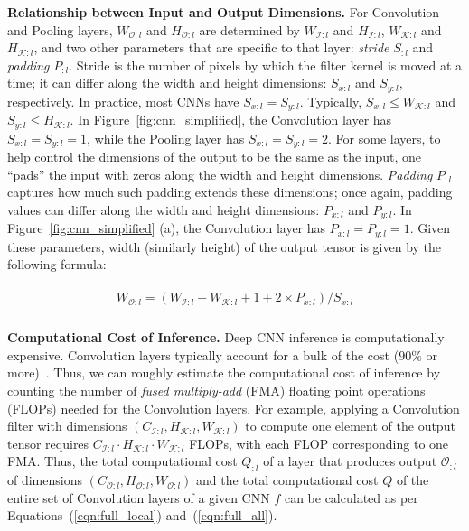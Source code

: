 \vspace{2mm}
\noindent \textbf{Relationship between Input and Output Dimensions.}
For Convolution and Pooling layers, $W_{\mathcal{O}:l}$ and $H_{\mathcal{O}:l}$ are determined by $W_{\mathcal{I}:l}$ and $H_{\mathcal{I}:l}$, $W_{\mathcal{K}:l}$ and $H_{\mathcal{K}:l}$, and two other parameters that are specific to that layer: \textit{stride} $S_{:l}$ and \textit{padding} $P_{:l}$. Stride is the number of pixels by which the filter kernel is moved at a time; it can differ along the width and height dimensions: $S_{x:l}$ and $S_{y:l}$, respectively. In practice, most CNNs have $S_{x:l} = S_{y:l}$. Typically, $S_{x:l} \leq W_{\mathcal{K}:l}$ and $S_{y:l} \leq H_{\mathcal{K}:l}$. In Figure~\ref{fig:cnn_simplified}, the Convolution layer has $S_{x:l} = S_{y:l} = 1$, while the Pooling layer has $S_{x:l} = S_{y:l} = 2$. For some layers, to help control the dimensions of the output to be the same as the input, one ``pads'' the input with zeros along the width and height dimensions. \textit{Padding} $P_{:l}$ captures how much such padding extends these dimensions; once again, padding values can differ along the width and height dimensions: $P_{x:l}$ and $P_{y:l}$. In Figure~\ref{fig:cnn_simplified} (a), the Convolution layer has $P_{x:l} = P_{y:l} = 1$. Given these parameters, width (similarly height) of the output tensor is given by the following formula:

\vspace{-4mm}
\begin{align}
\begin{split}
W_{\mathcal{O}:l} = (W_{\mathcal{I}:l} - W_{\mathcal{K}:l} + 1 + 2\times P_{x:l})/S_{x:l} \\
\end{split}
\end{align}
\vspace{-8mm}

\vspace{2mm}
\noindent \textbf{Computational Cost of Inference.}
Deep CNN inference is computationally expensive. Convolution layers typically account for a bulk of the cost ($90\%$ or more)~\cite{cavigelli2017cbinfer}. Thus, we can roughly estimate the computational cost of inference by counting the number of \textit{fused multiply-add} (FMA) floating point operations (FLOPs) needed for the Convolution layers.
For example, applying a Convolution filter with dimensions $(C_{\mathcal{I}:l} , H_{\mathcal{K}:l} , W_{\mathcal{K}:l})$ to compute one element of the output tensor requires $C_{\mathcal{I}:l} \cdot H_{\mathcal{K}:l} \cdot  W_{\mathcal{K}:l}$ FLOPs, with each FLOP corresponding to one FMA. Thus, the total computational cost $Q_{:l}$ of a layer that produces output $\mathcal{O}_{:l}$ of dimensions $(C_{\mathcal{O}:l} , H_{\mathcal{O}:l} , W_{\mathcal{O}:l})$ and the total computational cost $Q$ of the entire set of Convolution layers of a given CNN $f$ can be calculated as per Equations~(\ref{eqn:full_local}) and~(\ref{eqn:full_all}).

